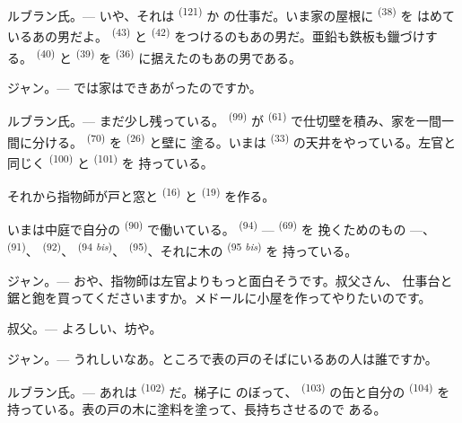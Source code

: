 \textsc{ルブラン氏}。--- いや、それは \textsuperscript{(121)} か
の仕事だ。いま家の屋根に \textsuperscript{(38)} を
はめているあの男だよ。 \textsuperscript{(43)} と
\textsuperscript{(42)} をつけるのもあの男だ。亜鉛も鉄板も鑞づけする。
 \textsuperscript{(40)} と \textsuperscript{(39)} を
 \textsuperscript{(36)} に据えたのもあの男である。

\textsc{ジャン}。--- では家はできあがったのですか。

\VUsaut{3.0mm}
\VUsaut{3.0mm}

\textsc{ルブラン氏}。--- まだ少し残っている。 \textsuperscript{(99)}
が \textsuperscript{(61)} で仕切壁を積み、家を一間一間に分ける。
 \textsuperscript{(70)} を \textsuperscript{(26)} と壁に
塗る。いまは \textsuperscript{(33)} の天井をやっている。左官と同じく
 \textsuperscript{(100)} と \textsuperscript{(101)} を
持っている。

それから指物師が戸と窓と \textsuperscript{(16)} と
\textsuperscript{(19)} を作る。

いまは中庭で自分の \textsuperscript{(90)} で働いている。
 \textsuperscript{(94)} ---  \textsuperscript{(69)} を
挽くためのもの ---、 \textsuperscript{(91)}、 \textsuperscript{(92)}、
 \textsuperscript{(94 \textit{bis})}、
\textsuperscript{(95)}、それに木の \textsuperscript{(95 \textit{bis})} を
持っている。

\textsc{ジャン}。--- おや、指物師は左官よりもっと面白そうです。叔父さん、
仕事台と鋸と鉋を買ってくださいますか。メドールに小屋を作ってやりたいのです。

\textsc{叔父}。--- よろしい、坊や。

\textsc{ジャン}。--- うれしいなあ。ところで表の戸のそばにいるあの人は誰ですか。

\VUsaut{3.0mm}
\VUsaut{3.0mm}

\textsc{ルブラン氏}。--- あれは \textsuperscript{(102)} だ。梯子に
のぼって、 \textsuperscript{(103)} の缶と自分の
\textsuperscript{(104)} を持っている。表の戸の木に塗料を塗って、長持ちさせるので
ある。

